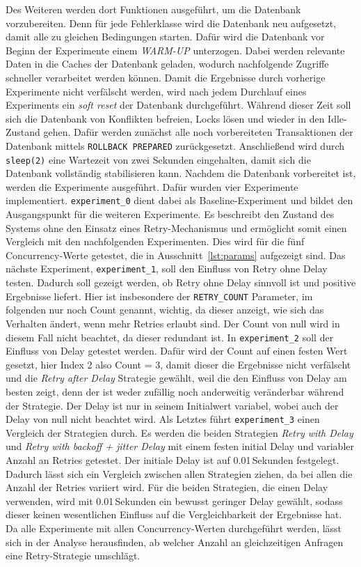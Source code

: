 
Des Weiteren werden dort Funktionen ausgeführt, um die Datenbank vorzubereiten.
Denn für jede Fehlerklasse wird die Datenbank neu aufgesetzt, damit alle zu gleichen Bedingungen starten.
Dafür wird die Datenbank vor Beginn der Experimente einem \emph{WARM-UP} unterzogen.
Dabei werden relevante Daten in die Caches der Datenbank geladen, wodurch nachfolgende Zugriffe schneller
verarbeitet werden können.
Damit die Ergebnisse durch vorherige Experimente nicht verfälscht werden, wird nach jedem Durchlauf eines
Experiments ein \emph{soft reset} der Datenbank durchgeführt.
Während dieser Zeit soll sich die Datenbank von Konflikten befreien, Locks lösen und wieder in den Idle-Zustand gehen.
Dafür werden zunächst alle noch vorbereiteten Transaktionen der Datenbank mittels \texttt{ROLLBACK PREPARED}
zurückgesetzt.
Anschließend wird durch \texttt{sleep(2)} eine Wartezeit von zwei Sekunden eingehalten, damit sich die Datenbank
vollständig stabilisieren kann.
Nachdem die Datenbank vorbereitet ist, werden die Experimente ausgeführt.
Dafür wurden vier Experimente implementiert.
\texttt{experiment\_0} dient dabei als Baseline-Experiment und bildet den Ausgangspunkt für die weiteren Experimente.
Es beschreibt den Zustand des Systems ohne den Einsatz eines Retry-Mechanismus und ermöglicht somit einen Vergleich
mit den nachfolgenden Experimenten.
Dies wird für die fünf Concurrency-Werte getestet, die in Ausschnitt~\ref{lst:params} aufgezeigt sind.
Das nächste Experiment, \texttt{experiment\_1}, soll den Einfluss von Retry ohne Delay testen.
Dadurch soll gezeigt werden, ob Retry ohne Delay sinnvoll ist und positive Ergebnisse liefert.
Hier ist insbesondere der \texttt{RETRY\_COUNT} Parameter, im folgenden nur noch Count genannt, wichtig, da dieser
anzeigt, wie sich das Verhalten ändert, wenn mehr Retries erlaubt sind.
Der Count von null wird in diesem Fall nicht beachtet, da dieser redundant ist.
In \texttt{experiment\_2} soll der Einfluss von Delay getestet werden.
Dafür wird der Count auf einen festen Wert gesetzt, hier Index 2 also Count = 3, damit dieser die Ergebnisse nicht
verfälscht und die \emph{Retry after Delay} Strategie gewählt, weil die den Einfluss von Delay am besten zeigt, denn
der ist weder zufällig noch anderweitig veränderbar während der Strategie.
Der Delay ist nur in seinem Initialwert variabel, wobei auch der Delay von null nicht beachtet wird.
Als Letztes führt \texttt{experiment\_3} einen Vergleich der Strategien durch.
Es werden die beiden Strategien \emph{Retry with Delay} und \emph{Retry with backoff + jitter Delay} mit einem festen
initial Delay und variabler Anzahl an Retries getestet.
Der initiale Delay ist auf 0.01\,Sekunden festgelegt.
Dadurch lässt sich ein Vergleich zwischen allen Strategien ziehen, da bei allen die Anzahl der Retries variiert
wird.
Für die beiden Strategien, die einen Delay verwenden, wird mit 0.01\,Sekunden ein bewusst geringer Delay gewählt,
sodass dieser keinen wesentlichen Einfluss auf die Vergleichbarkeit der Ergebnisse hat.
Da alle Experimente mit allen Concurrency-Werten durchgeführt werden, lässt sich in der Analyse herausfinden, ab
welcher Anzahl an gleichzeitigen Anfragen eine Retry-Strategie umschlägt.

